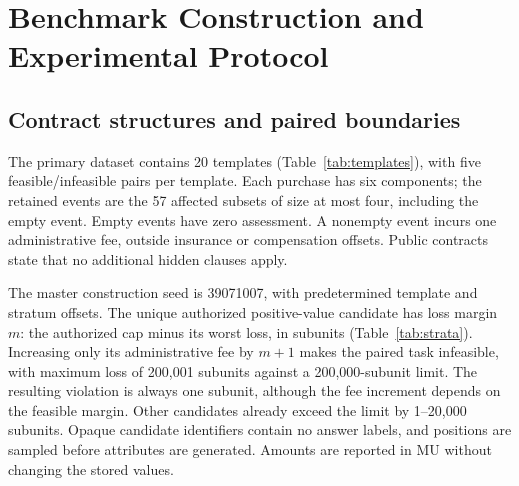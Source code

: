 \section{Benchmark Construction and Experimental Protocol}
\label{app:data}
\label{app:protocol}
\subsection{Contract structures and paired boundaries}
The primary dataset contains 20 templates (Table~\ref{tab:templates}), with five feasible/infeasible pairs per template. Each purchase has six components; the retained events are the 57 affected subsets of size at most four, including the empty event. Empty events have zero assessment. A nonempty event incurs one administrative fee, outside insurance or compensation offsets. Public contracts state that no additional hidden clauses apply.

The master construction seed is 39071007, with predetermined template and stratum offsets. The unique authorized positive-value candidate has loss margin $m$: the authorized cap minus its worst loss, in subunits (Table~\ref{tab:strata}). Increasing only its administrative fee by $m+1$ makes the paired task infeasible, with maximum loss of 200,001 subunits against a 200,000-subunit limit. The resulting violation is always one subunit, although the fee increment depends on the feasible margin. Other candidates already exceed the limit by 1--20,000 subunits. Opaque candidate identifiers contain no answer labels, and positions are sampled before attributes are generated. Amounts are reported in MU without changing the stored values.

